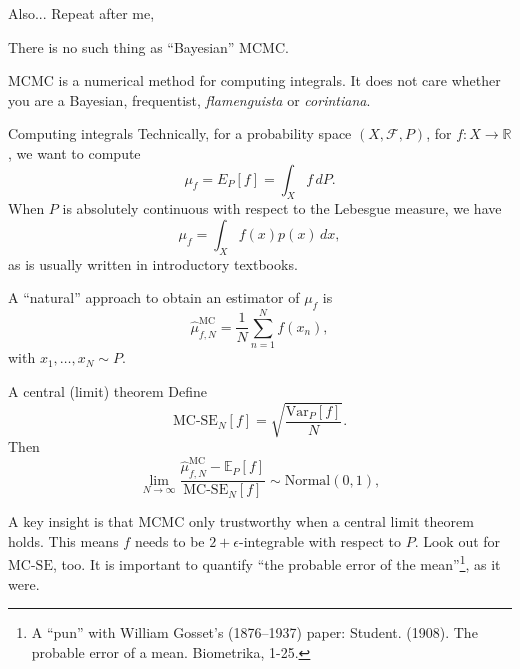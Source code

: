 \begin{frame}{Also...}
 Repeat after me,
 \begin{idea}
 \begin{center}
  {\Huge There is no such thing as ``Bayesian'' MCMC.}
 \end{center}  
  
  MCMC is a numerical method for computing integrals.
  It does not care whether you are a Bayesian, frequentist, \textit{flamenguista} or \textit{corintiana}.
 \end{idea}
\end{frame}
\begin{frame}{Computing integrals}
Technically, for a probability space $(X, \mathcal{F}, P)$, for $f : X \to \mathbb{R}$, we want to compute
$$
\mu_f = E_P[f] = \int_{X} f\,dP.  
$$
When $P$ is absolutely continuous with respect to the Lebesgue measure, we have 
$$
\mu_f= \int_{X} f(x)p(x)\,dx,
$$
as is usually written in introductory textbooks.

A ``natural'' approach to obtain an estimator of  $\mu_f$ is
$$
\hat{\mu}_{f, N}^{\text{MC}} = \frac{1}{N} \sum_{n = 1}^{N} f(x_{n}),
$$
with $x_1, \ldots, x_N \sim P$.
\end{frame}
\begin{frame}{A central (limit) theorem}
Define
$$
\text{MC-SE}_{N}[f]
= \sqrt{ \frac{ \text{Var}_{P}[f]}{N} }.
$$
Then
$$
\lim_{N \rightarrow \infty}
\frac{ \hat{\mu}_{f,N}^{\text{MC}} - \mathbb{E}_{P}[f] }
{ \text{MC-SE}_{N}[f] }
\sim \text{Normal}(0, 1),
$$
\begin{idea}
 A key insight is that MCMC only trustworthy when a central limit theorem holds.
 This means $f$ needs to be $2+\epsilon$-integrable with respect to $P$.
 Look out for $\text{MC-SE}$, too. 
 It is important to quantify ``the probable error of the mean''\footnote{A ``pun'' with William Gosset's (1876--1937) paper: Student. (1908). The probable error of a mean. Biometrika, 1-25.}, as it were.
\end{idea}
\end{frame}
